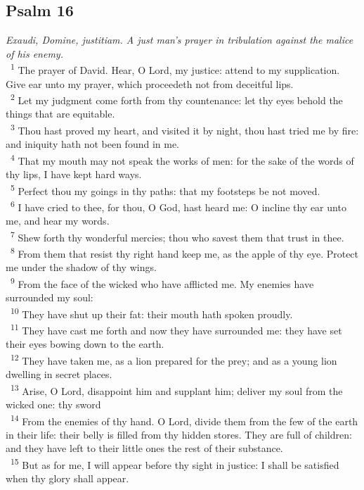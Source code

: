 \documentclass[a5paper,12pt]{article}
\begin{document}
\begin{multicols*}{2}
\section{Psalm 16}
\label{sec:org7f9af21}
\emph{Exaudi, Domine, justitiam. A just man's prayer in tribulation against the malice of his enemy.}\\

~\textsuperscript{1} The prayer of David. Hear, O Lord, my justice: attend to my supplication. Give ear unto my prayer, which proceedeth not from deceitful lips.\\
~\textsuperscript{2} Let my judgment come forth from thy countenance: let thy eyes behold the things that are equitable.\\
~\textsuperscript{3} Thou hast proved my heart, and visited it by night, thou hast tried me by fire: and iniquity hath not been found in me.\\
~\textsuperscript{4} That my mouth may not speak the works of men: for the sake of the words of thy lips, I have kept hard ways.\\
~\textsuperscript{5} Perfect thou my goings in thy paths: that my footsteps be not moved.\\
~\textsuperscript{6} I have cried to thee, for thou, O God, hast heard me: O incline thy ear unto me, and hear my words.\\
~\textsuperscript{7} Shew forth thy wonderful mercies; thou who savest them that trust in thee.\\
~\textsuperscript{8} From them that resist thy right hand keep me, as the apple of thy eye. Protect me under the shadow of thy wings.\\
~\textsuperscript{9} From the face of the wicked who have afflicted me. My enemies have surrounded my soul:\\
~\textsuperscript{10} They have shut up their fat: their mouth hath spoken proudly.\\
~\textsuperscript{11} They have cast me forth and now they have surrounded me: they have set their eyes bowing down to the earth.\\
~\textsuperscript{12} They have taken me, as a lion prepared for the prey; and as a young lion dwelling in secret places.\\
~\textsuperscript{13} Arise, O Lord, disappoint him and supplant him; deliver my soul from the wicked one: thy sword\\
~\textsuperscript{14} From the enemies of thy hand. O Lord, divide them from the few of the earth in their life: their belly is filled from thy hidden stores. They are full of children: and they have left to their little ones the rest of their substance.\\
~\textsuperscript{15} But as for me, I will appear before thy sight in justice: I shall be satisfied when thy glory shall appear.\\


\end{multicols*}
\end{document}
